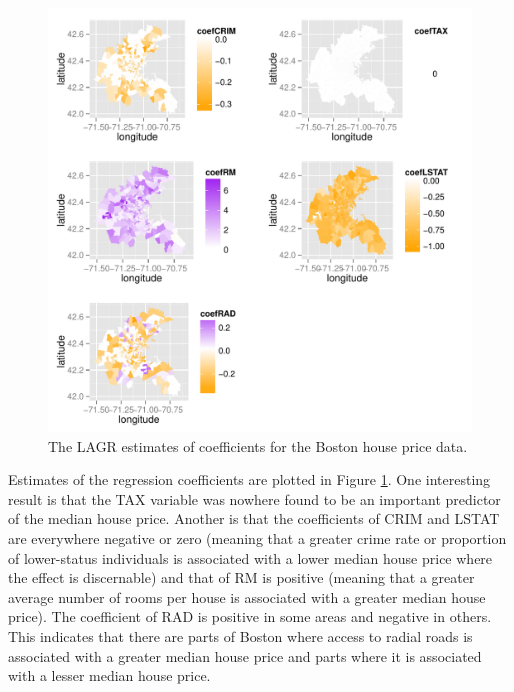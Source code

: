 \documentclass[12pt,english,authoryear, review]{article}\usepackage[]{graphicx}\usepackage[]{color}
\makeatletter
\def\maxwidth{ %
  \ifdim\Gin@nat@width>\linewidth
    \linewidth
  \else
    \Gin@nat@width
  \fi
}
\theoremstyle{plain}
\theoremstyle{plain}
\makeatother
\begin{document}
\begin{figure}

\includegraphics[width=\maxwidth]{figure/boston-plots} 


\caption{The LAGR estimates of coefficients for the Boston house price data.\label{fig:boston-lagr-coefs}}
\end{figure}

Estimates of the regression coefficients are plotted in Figure \ref{fig:boston-lagr-coefs}.
One interesting result is that the TAX variable was nowhere found
to be an important predictor of the median house price. Another is
that the coefficients of CRIM and LSTAT are everywhere negative or
zero (meaning that a greater crime rate or proportion of lower-status
individuals is associated with a lower median house price where the
effect is discernable) and that of RM is positive (meaning that a
greater average number of rooms per house is associated with a greater
median house price). The coefficient of RAD is positive in some areas
and negative in others. This indicates that there are parts of Boston
where access to radial roads is associated with a greater median house
price and parts where it is associated with a lesser median house
price.
\end{document}
